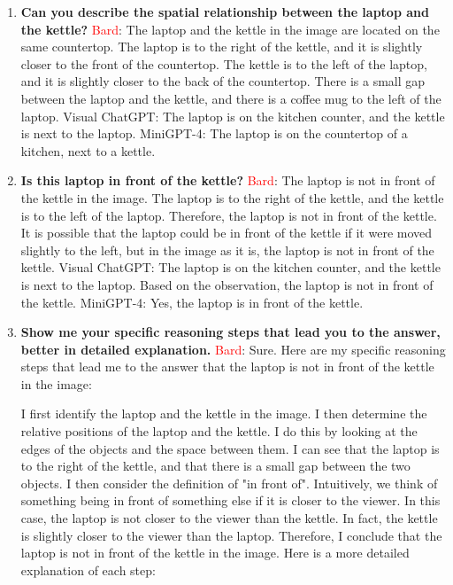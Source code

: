 \begin{enumerate}
    \item \textbf{Can you describe the spatial relationship between the laptop and the kettle?}
    \subitem \textcolor{Red}{Bard}: 
    The laptop and the kettle in the image are located on the same countertop. The laptop is to the right of the kettle, and it is slightly closer to the front of the countertop. The kettle is to the left of the laptop, and it is slightly closer to the back of the countertop. There is a small gap between the laptop and the kettle, and there is a coffee mug to the left of the laptop.
    \subitem Visual ChatGPT: The laptop is on the kitchen counter, and the kettle is next to the laptop.
    \subitem MiniGPT-4: The laptop is on the countertop of a kitchen, next to a kettle.
    \item \textbf{Is this laptop in front of the kettle?}
    \subitem \textcolor{Red}{Bard}: 
    The laptop is not in front of the kettle in the image. The laptop is to the right of the kettle, and the kettle is to the left of the laptop. Therefore, the laptop is not in front of the kettle. It is possible that the laptop could be in front of the kettle if it were moved slightly to the left, but in the image as it is, the laptop is not in front of the kettle.
    \subitem Visual ChatGPT: The laptop is on the kitchen counter, and the kettle is next to the laptop. Based on the observation, the laptop is not in front of the kettle.
    \subitem MiniGPT-4: Yes, the laptop is in front of the kettle.
    \item \textbf{Show me your specific reasoning steps that lead you to the answer, better in detailed explanation.}
    \subitem \textcolor{Red}{Bard}: Sure. Here are my specific reasoning steps that lead me to the answer that the laptop is not in front of the kettle in the image:

    I first identify the laptop and the kettle in the image.
    I then determine the relative positions of the laptop and the kettle. I do this by looking at the edges of the objects and the space between them. I can see that the laptop is to the right of the kettle, and that there is a small gap between the two objects.
    I then consider the definition of "in front of". Intuitively, we think of something being in front of something else if it is closer to the viewer. In this case, the laptop is not closer to the viewer than the kettle. In fact, the kettle is slightly closer to the viewer than the laptop.
    Therefore, I conclude that the laptop is not in front of the kettle in the image.
    Here is a more detailed explanation of each step:
    

\end{enumerate}
